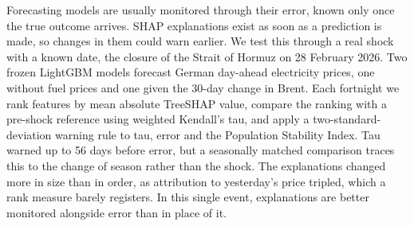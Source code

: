 Forecasting models are usually monitored through their error, known only
once the true outcome arrives. SHAP explanations exist as soon as a
prediction is made, so changes in them could warn earlier. We test this
through a real shock with a known date, the closure of the Strait of Hormuz
on 28 February 2026. Two frozen LightGBM models forecast German day-ahead
electricity prices, one without fuel prices and one given the 30-day change
in Brent. Each fortnight we rank features by mean absolute TreeSHAP value,
compare the ranking with a pre-shock reference using weighted Kendall's tau,
and apply a two-standard-deviation warning rule to tau, error and the
Population Stability Index. Tau warned up to 56 days before error, but a
seasonally matched comparison traces this to the change of season rather
than the shock. The explanations changed more in size than in order, as
attribution to yesterday's price tripled, which a rank measure barely
registers. In this single event, explanations are better monitored
alongside error than in place of it.
